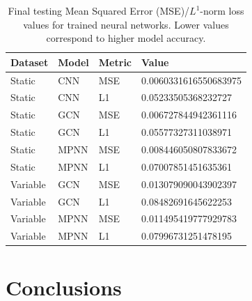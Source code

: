 \documentclass[review]{siamart190516}
\begin{document}
\begin{table}[t]
\centering
\begin{tabular}{|l|l|l|l|}
\hline
Dataset & Model & Metric & Value \\
\hline
Static & CNN & MSE & 0.0060331616550683975 \\
Static & CNN & L1 & 0.05233505368232727 \\
\hline
Static & GCN & MSE & 0.006727844942361116 \\
Static & GCN & L1 & 0.05577327311038971 \\
\hline
Static & MPNN & MSE & 0.008446050807833672 \\
Static & MPNN & L1 & 0.07007851451635361 \\
\hline
Variable & GCN & MSE & 0.013079090043902397 \\
Variable & GCN & L1 & 0.08482691645622253 \\
\hline
Variable & MPNN & MSE & 0.011495419777929783 \\
Variable & MPNN & L1 & 0.07996731251478195 \\
\hline
\end{tabular}
\caption{Final testing Mean Squared Error (MSE)/$L^1$-norm loss values for trained neural networks.  Lower values correspond to higher model accuracy.}
\label{tab:conv_loss}
\end{table}

\section{Conclusions}\label{sec:conc}



\end{document}
